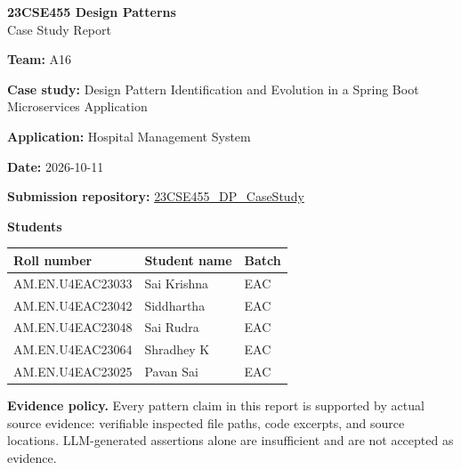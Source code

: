 \documentclass[11pt,a4paper]{article}
\begin{document}
\begin{center}\Large\textbf{23CSE455 Design Patterns}\\[4pt]\LARGE Case Study Report\end{center}

\textbf{Team:} A16\par
\textbf{Case study:} Design Pattern Identification and Evolution in a Spring Boot Microservices Application\par
\textbf{Application:} Hospital Management System\par
\textbf{Date:} 2026-10-11\par
\textbf{Submission repository:} \href{https://github.com/aswathymohan-amrita/23CSE455_DP_CaseStudy}{23CSE455\_DP\_CaseStudy}\par

\textbf{Students}\par
\begin{tabularx}{\linewidth}{@{}llX@{}}\toprule
Roll number & Student name & Batch\\\midrule
AM.EN.U4EAC23033 & Sai Krishna & EAC\\
AM.EN.U4EAC23042 & Siddhartha & EAC\\
AM.EN.U4EAC23048 & Sai Rudra & EAC\\
AM.EN.U4EAC23064 & Shradhey K & EAC\\
AM.EN.U4EAC23025 & Pavan Sai & EAC\\\bottomrule
\end{tabularx}

\begin{abstract}
This report studies the design patterns present in the \emph{Hospital Management System}, a Spring Boot microservices backend with a PostgreSQL database. Part 1 reports a baseline candidate set of four confirmed pattern categories comprising four recorded instances: the Builder pattern (GoF, creational; 1 instance), Singleton (Spring Idiom; 1 instance), Proxy (GoF, structural; 1 instance), and the architectural pattern Repository (1 instance).
\end{abstract}

\noindent\textbf{Evidence policy.}
Every pattern claim in this report is supported by actual source evidence: verifiable inspected file paths, code excerpts, and source locations. LLM-generated assertions alone are insufficient and are not accepted as evidence.
\end{document}
